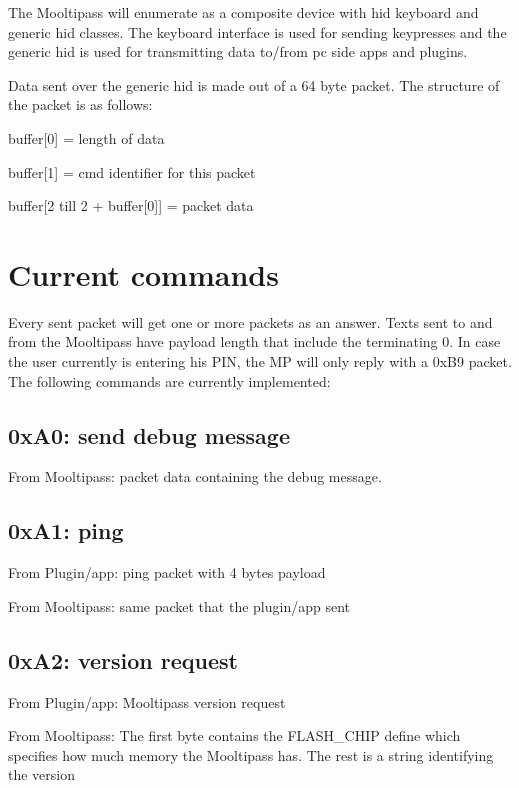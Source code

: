 The Mooltipass will enumerate as a composite device with hid keyboard and generic hid classes. The keyboard interface is used for sending keypresses and the generic hid is used for transmitting data to/from pc side apps and plugins.

Data sent over the generic hid is made out of a 64 byte packet. The structure of the packet is as follows\+:

buffer\mbox{[}0\mbox{]} = length of data

buffer\mbox{[}1\mbox{]} = cmd identifier for this packet

buffer\mbox{[}2 till 2 + buffer\mbox{[}0\mbox{]}\mbox{]} = packet data

\section*{Current commands }

Every sent packet will get one or more packets as an answer. Texts sent to and from the Mooltipass have payload length that include the terminating 0. In case the user currently is entering his P\+IN, the MP will only reply with a 0x\+B9 packet. The following commands are currently implemented\+:

\subsection*{0x\+A0\+: send debug message }

From Mooltipass\+: packet data containing the debug message.

\subsection*{0x\+A1\+: ping }

From Plugin/app\+: ping packet with 4 bytes payload

From Mooltipass\+: same packet that the plugin/app sent

\subsection*{0x\+A2\+: version request }

From Plugin/app\+: Mooltipass version request

From Mooltipass\+: The first byte contains the F\+L\+A\+S\+H\+\_\+\+C\+H\+IP define which specifies how much memory the Mooltipass has. The rest is a string identifying the version


